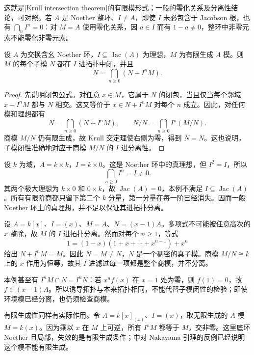 这就是[Krull intersection theorem]的有限模形式；一般的零化关系及分离性结论，可对照\cite[第8节，定理8.9—8.10，第60页]{Matsumura1989}。若 \(A\) 是 Noether 整环、\(I\ne A\)，即使 \(I\) 未必包含于 Jacobson 根，也有 \(\bigcap_n I^n=0\)：对 \(M=A\) 使用零化关系，因 \(a\in I\) 而有 \(1-a\ne0\)，整环中非零元素不能零化非零元素。

\begin{corollary}\label{g5:cor:adic-submodule-closed}
	设 \(A\) 为交换含幺 Noether 环，\(I\subseteq\operatorname{Jac}(A)\) 为理想，\(M\) 为有限生成 \(A\) 模。则 \(M\) 的每个子模 \(N\) 都在 \(I\) 进拓扑中闭，并且
	\[
		N=\bigcap_{n\geq0}(N+I^nM).
	\]
\end{corollary}
\begin{proof}
	先说明闭包公式。对任意 \(x\in M\)，它属于 \(N\) 的闭包，当且仅当每个邻域 \(x+I^nM\) 都与 \(N\) 相交。这又等价于 \(x\in N+I^nM\) 对每个 \(n\) 成立。因此，对任何模和理想都有
	\[
		\overline N=\bigcap_{n\geq0}(N+I^nM),
		\qquad
		\overline N/N=\bigcap_{n\geq0}I^n(M/N).
	\]
	商模 \(M/N\) 仍有限生成，故 Krull 交定理使右侧为零，得到 \(\overline N=N\)。这也说明，子模闭性准确地对应于商模 \(M/N\) 的 \(I\) 进分离性。
\end{proof}

\begin{example}\label{g5:exm:idempotent-adic-nonseparated}
	设 \(k\) 为域，\(A=k\times k\)，\(I=k\times0\)。这是 Noether 环中的真理想，但 \(I^2=I\)，所以
	\[
		\bigcap_{n\geq0}I^n=I\ne0.
	\]
	其两个极大理想为 \(k\times0\) 和 \(0\times k\)，故 \(\operatorname{Jac}(A)=0\)，本例不满足 \(I\subseteq\operatorname{Jac}(A)\)。所有有限阶商都只留下第二个 \(k\) 分量，第一分量在每一阶已经消失。因而一般 Noether 环上的真理想，并不足以保证其进拓扑分离。
\end{example}

\begin{example}\label{g5:exm:separated-module-dense-submodule}
	设 \(A=k[x]\)、\(I=(x)\)、\(M=A\)、\(N=(x-1)A\)。多项式不可能被任意高次的 \(x\) 整除，故 \(M\) 的 \(I\) 进拓扑分离。然而对每个 \(n\geq1\)，等式
	\[
		1=(1-x)(1+x+\cdots+x^{n-1})+x^n
	\]
	给出 \(N+I^nM=M\)。因此 \(\overline N=M\ne N\)，\(N\) 是一个稠密的真子模。商模 \(M/N\cong k\) 上的 \(x\) 作用为恒等，故其 \(I\) 进滤过每一项都是整个商模，并不分离。

	本例甚至有 \(I^nM\cap N=I^nN\)：若 \(x^nf(x)\) 在 \(x=1\) 处为零，则 \(f(1)=0\)，故 \(f\in(x-1)A\)。所以诱导拓扑与本来拓扑相同，不能代替子模闭性的检验；即使环境模已经分离，也仍须检查商模。
\end{example}

有限生成性同样有实际作用。令 \(A=k[x]_{(x)}\)、\(I=(x)\)，取无限生成的 \(A\) 模 \(M=k(x)\)。因为乘以 \(x\) 在 \(M\) 上可逆，所有 \(I^nM\) 都等于 \(M\)，交非零。这里底环 Noether 且局部，失效的是有限生成条件；中对 Nakayama 引理的反例已经说明这个模不能有限生成。
